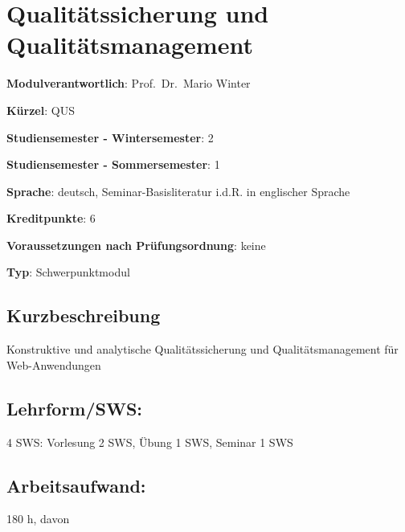 \chapter{Qualitätssicherung und
Qualitätsmanagement}\label{qualituxe4tssicherung-und-qualituxe4tsmanagement}

\begin{modulHead}
\textbf{Modulverantwortlich}: Prof.~Dr.~Mario
Winter
\end{modulHead}
\begin{modulHead}
\textbf{Kürzel}:
QUS
\end{modulHead}
\begin{modulHead}
\textbf{Studiensemester -
Wintersemester}:
2
\end{modulHead}
\begin{modulHead}
\textbf{Studiensemester -
Sommersemester}: 1
\end{modulHead}
\begin{modulHead}
\textbf{Sprache}:
deutsch, Seminar-Basisliteratur i.d.R. in englischer
Sprache
\end{modulHead}
\begin{modulHead}
\textbf{Kreditpunkte}:
6
\end{modulHead}
\begin{modulHead}
\textbf{Voraussetzungen nach
Prüfungsordnung}: keine
\end{modulHead}
\begin{modulHead}
\textbf{Typ}:
Schwerpunktmodul
\end{modulHead}


\section*{Kurzbeschreibung}\label{kurzbeschreibung-17}

Konstruktive und analytische Qualitätssicherung und Qualitätsmanagement
für Web-Anwendungen

\section*{Lehrform/SWS:}\label{lehrformsws-22}

4 SWS: Vorlesung 2 SWS, Übung 1 SWS, Seminar 1 SWS

\section*{Arbeitsaufwand:}\label{arbeitsaufwand-27}

180 h, davon

